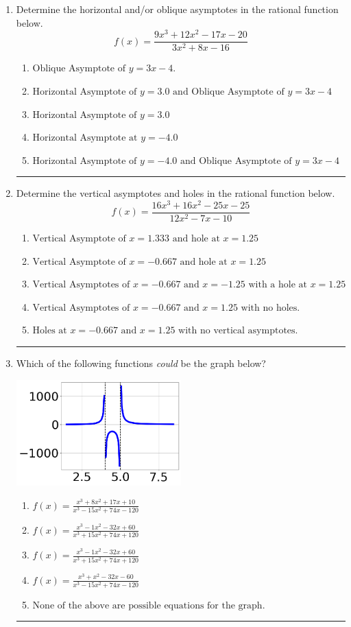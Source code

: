 \documentclass[14pt]{extbook}
\newcommand{\litem}[1]{\item#1\hspace*{-1cm}\rule{\textwidth}{0.4pt}}
\begin{document}
\begin{enumerate}
\litem{
Determine the horizontal and/or oblique asymptotes in the rational function below.\[ f(x) = \frac{9x^{3} +12 x^{2} -17 x -20}{3x^{2} +8 x -16} \]\begin{enumerate}[label=\Alph*.]
\item \( \text{Oblique Asymptote of } y = 3x -4. \)
\item \( \text{Horizontal Asymptote of } y = 3.0 \text{ and Oblique Asymptote of } y = 3x -4 \)
\item \( \text{Horizontal Asymptote of } y = 3.0  \)
\item \( \text{Horizontal Asymptote at } y = -4.0 \)
\item \( \text{Horizontal Asymptote of } y = -4.0 \text{ and Oblique Asymptote of } y = 3x -4 \)

\end{enumerate} }
\litem{
Determine the vertical asymptotes and holes in the rational function below.\[ f(x) = \frac{16x^{3} +16 x^{2} -25 x -25}{12x^{2} -7 x -10} \]\begin{enumerate}[label=\Alph*.]
\item \( \text{Vertical Asymptote of } x = 1.333 \text{ and hole at } x = 1.25 \)
\item \( \text{Vertical Asymptote of } x = -0.667 \text{ and hole at } x = 1.25 \)
\item \( \text{Vertical Asymptotes of } x = -0.667 \text{ and } x = -1.25 \text{ with a hole at } x = 1.25 \)
\item \( \text{Vertical Asymptotes of } x = -0.667 \text{ and } x = 1.25 \text{ with no holes.} \)
\item \( \text{Holes at } x = -0.667 \text{ and } x = 1.25 \text{ with no vertical asymptotes.} \)

\end{enumerate} }
\litem{
Which of the following functions \textit{could} be the graph below?
\begin{center}
    \includegraphics[width=0.5\textwidth]{../Figures/identifyGraphOfRationalFunctionCopyA.png}
\end{center}
\begin{enumerate}[label=\Alph*.]
\item \( f(x)=\frac{x^{3} +8 x^{2} +17 x + 10}{x^{3} -15 x^{2} +74 x -120} \)
\item \( f(x)=\frac{x^{3} -1 x^{2} -32 x + 60}{x^{3} +15 x^{2} +74 x + 120} \)
\item \( f(x)=\frac{x^{3} -1 x^{2} -32 x + 60}{x^{3} +15 x^{2} +74 x + 120} \)
\item \( f(x)=\frac{x^{3} + x^{2} -32 x -60}{x^{3} -15 x^{2} +74 x -120} \)
\item \( \text{None of the above are possible equations for the graph.} \)


\end{enumerate}}
\end{enumerate}
\end{document}

